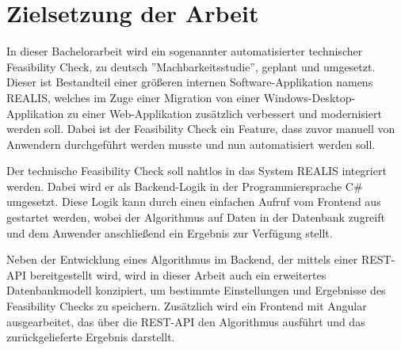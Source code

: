 \section{Zielsetzung der Arbeit}
In dieser Bachelorarbeit wird ein sogenannter automatisierter technischer Feasibility Check, zu deutsch ''Machbarkeitsstudie'', geplant und umgesetzt. Dieser ist Bestandteil einer größeren internen Software-Applikation namens \gls{REALIS}, welches
im Zuge einer Migration von einer Windows-Desktop-Applikation zu einer Web-Applikation zusätzlich verbessert und modernisiert werden soll. Dabei ist der Feasibility Check ein Feature, dass zuvor manuell von Anwendern durchgeführt werden musste und nun automatisiert werden soll.

Der technische Feasibility Check soll nahtlos in das System \gls{REALIS} integriert werden. Dabei wird er als Backend-Logik in der Programmiersprache C\# umgesetzt. Diese Logik kann durch einen einfachen Aufruf vom Frontend aus gestartet werden, wobei der Algorithmus auf Daten in der Datenbank zugreift und dem Anwender anschließend ein Ergebnis zur Verfügung stellt.

Neben der Entwicklung eines Algorithmus im Backend, der mittels einer REST-API bereitgestellt wird, wird in dieser Arbeit auch ein erweitertes Datenbankmodell konzipiert, um bestimmte Einstellungen und Ergebnisse des Feasibility Checks zu speichern. Zusätzlich wird ein Frontend mit Angular ausgearbeitet, das über die REST-API den Algorithmus ausführt und das zurückgelieferte Ergebnis darstellt.